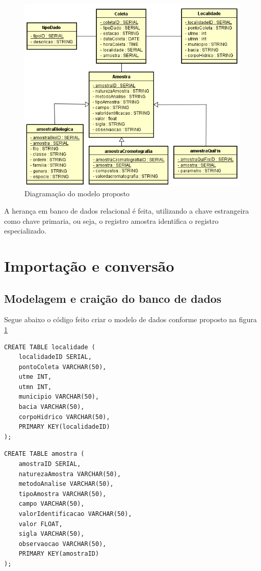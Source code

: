 \begin{figure}[!h]
    \centering
    \includegraphics[scale=0.7]{Imagens/Imagens/MER.png}
    \caption{Diagramação do modelo proposto}\label{diagramaClasse}
\end{figure}

A herança em banco de dados relacional é feita, utilizando a chave estrangeira como chave primaria, ou seja, o registro amostra identifica o registro especializado.

\section{Importação e conversão}

\subsection{Modelagem e craição do banco de dados}

Segue abaixo o código feito criar o modelo de dados conforme proposto na figura \ref{diagramaClasse}

\lstset{language=SQL}
\begin{lstlisting}[frame=single]
CREATE TABLE localidade (
    localidadeID SERIAL,
    pontoColeta VARCHAR(50),
	utme INT,
	utmn INT,
	municipio VARCHAR(50),
	bacia VARCHAR(50),
	corpoHidrico VARCHAR(50),
	PRIMARY KEY(localidadeID)
);
\end{lstlisting}

\begin{lstlisting}[frame=single]
CREATE TABLE amostra (
	amostraID SERIAL,
	naturezaAmostra VARCHAR(50),
	metodoAnalise VARCHAR(50),
	tipoAmostra VARCHAR(50),
    campo VARCHAR(50),
    valorIdentificacao VARCHAR(50),
	valor FLOAT,
	sigla VARCHAR(50),
	observaocao VARCHAR(50),
	PRIMARY KEY(amostraID)
);
\end{lstlisting}

